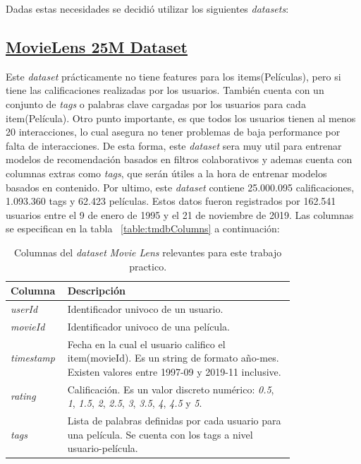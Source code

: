 \documentclass[11pt,a4paper,twoside]{thesis}
\begin{document}
Dadas estas necesidades se decidió utilizar los siguientes \textit{datasets}:


\subsection{\href{https://grouplens.org/datasets/movielens/25m/}{MovieLens 25M Dataset}}

Este \textit{dataset} prácticamente no tiene features para los items(Películas), pero si tiene las calificaciones realizadas 
por los usuarios. También cuenta con un conjunto de \textit{tags} o palabras clave cargadas por los usuarios para cada 
item(Película). Otro punto importante, es que todos los usuarios tienen al menos 20 interacciones, lo cual asegura
no tener problemas de baja performance por falta de interacciones. 
De esta forma, este \textit{dataset} sera muy util para entrenar modelos de recomendación basados en filtros colaborativos
y ademas cuenta con columnas extras como \textit{tags}, que serán útiles a la hora de entrenar modelos basados en contenido.
Por ultimo, este \textit{dataset} contiene 25.000.095 calificaciones, 1.093.360 tags y 62.423 películas. Estos datos fueron registrados por 162.541 usuarios entre el 9 de enero de 1995 y el 21 de noviembre de 2019. Las columnas se especifican en la tabla ~\ref{table:tmdbColumns} a continuación:




\begin{table}[!htb]
	\centering
	\footnotesize
	\begin{tabular}{l | p{0.8\linewidth}}
	\hline
		Columna         & Descripción \\
	\hline
	\textit{userId}     & Identificador univoco de un usuario.\\
	\textit{movieId}    & Identificador univoco de una película.\\
	\textit{timestamp}  & Fecha en la cual el usuario califico el item(movieId). Es un string de formato año-mes. Existen valores entre 1997-09 y 2019-11 inclusive. \\
	\textit{rating}     & Calificación. Es un valor discreto numérico: \textit{0.5}, \textit{1}, \textit{1.5}, \textit{2}, \textit{2.5}, \textit{3}, \textit{3.5}, \textit{4}, \textit{4.5} y \textit{5}. \\
	\textit{tags}       & Lista de palabras definidas por cada usuario para una película. Se cuenta con los tags a nivel usuario-película. \\
	\hline
	\end{tabular}
	\caption{
		Columnas del \textit{dataset} \textit{Movie Lens} relevantes para este trabajo practico.
	}
	\label{table:movieLensColumns}
\end{table}
\end{document}
